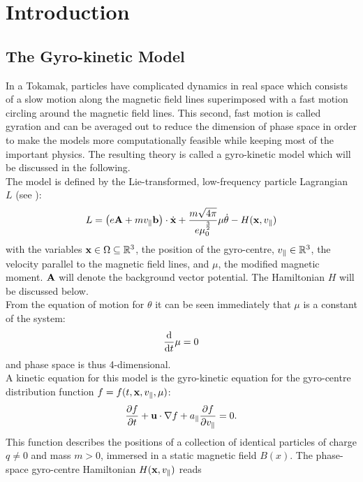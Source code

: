 
\section{Introduction}
\label{sec:introduction}
\subsection{The Gyro-kinetic Model}

In a Tokamak, particles have complicated dynamics in real space which consists of a slow motion along the magnetic field lines superimposed with a fast motion circling around the magnetic field lines. This second, fast motion is called gyration and can be averaged out to reduce the dimension of phase space in order to make the models more computationally feasible while keeping most of the important physics. The resulting theory is called a gyro-kinetic model which will be discussed in the following.\\
The model is defined by the Lie-transformed, low-frequency particle Lagrangian $L$ (see \cite{Bottino_Sonnendrucker_2015}):
\begin{equation}\label{Lagrangian}
	L = \left(e\mathbf{A} + m v_\parallel \mathbf{b} \right)\cdot\dot{\mathbf{x}} + \frac{m\sqrt{4\pi}}{e \mu_0^{\frac{3}{2}}} \mu \dot{\theta} - H(\mathbf{x}, v_\parallel)
\end{equation}
with the variables $\mathbf{x} \in \Omega \subseteq \mathbb{R}^3$, the position of the gyro-centre, $v_\parallel \in \mathbb{R}^3$, the velocity parallel to the magnetic field lines, and $\mu$, the modified magnetic moment. $\mathbf{A}$ will denote the background vector potential. The Hamiltonian $H$ will be discussed below.\\
From the equation of motion for $\theta$ it can be seen immediately that $\mu$ is a constant of the system:
\begin{equation}
	\frac{\text{d} }{\text{d} t} \mu = 0
\end{equation}
and phase space is thus 4-dimensional.\\
A kinetic equation for this model is the gyro-kinetic equation for the gyro-centre distribution function $f=f(t,\mathbf{x}, v_\parallel, \mu)$:
\begin{equation}\label{drift-kinetic model}
	\frac{\partial f}{\partial t} + \mathbf{u} \cdot \nabla f + a_\parallel \frac{\partial f}{\partial v_\parallel} = 0.
\end{equation}
This function describes the positions of a collection of identical particles of charge $q\neq0$ and mass $m>0$, immersed in a static magnetic field $B(x)$.
The phase-space gyro-centre Hamiltonian $H(\mathbf{x}, v_\parallel)$ reads
